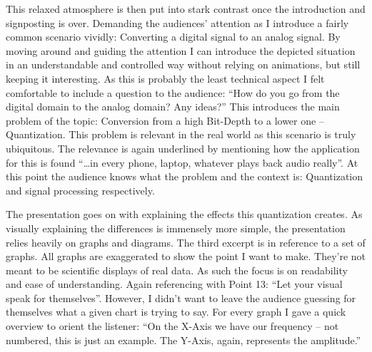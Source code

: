 This relaxed atmosphere is then put into stark contrast once the introduction and signposting is over.
Demanding the audiences' attention as I introduce a fairly common scenario vividly: Converting a digital signal to an analog signal.
By moving around and guiding the attention I can introduce the depicted situation in an understandable and controlled way without relying on animations, but still keeping it interesting.
As this is probably the least technical aspect I felt comfortable to include a question to the audience:
\enquote{How do you go from the digital domain to the analog domain? Any ideas?}
This introduces the main problem of the topic: Conversion from a high Bit-Depth to a lower one -- Quantization.
This problem is relevant in the real world as this scenario is truly ubiquitous.
The relevance is again underlined by mentioning how the application for this is found \enquote{\ldots in every phone, laptop, whatever plays back audio really}.
At this point the audience knows what the problem and the context is: Quantization and signal processing respectively.

The presentation goes on with explaining the effects this quantization creates.
As visually explaining the differences is immensely more simple, the presentation relies heavily on graphs and diagrams.
The third excerpt is in reference to a set of graphs.
All graphs are exaggerated to show the point I want to make.
They're not meant to be scientific displays of real data.
As such the focus is on readability and ease of understanding.
Again referencing \citeauthor{powell2011presenting} with Point 13: \enquote{Let your visual speak for themselves}\autocite[Page 8]{powell2011presenting}.
However, I didn't want to leave the audience guessing for themselves what a given chart is trying to say.
For every graph I gave a quick overview to orient the listener:
\enquote{On the X-Axis we have our frequency -- not numbered, this is just an example. The Y-Axis, again, represents the amplitude.}

